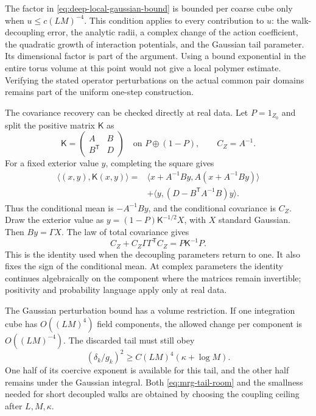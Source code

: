 \documentclass[11pt,letterpaper,reqno]{amsart}
\theoremstyle{definition}
\theoremstyle{remark}
\begin{document}
The factor in \eqref{eq:deep-local-gaussian-bound} is bounded
per coarse cube only when $u\le c(LM)^{-4}$. This condition
applies to every contribution to $u$: the walk-decoupling error,
the analytic radii, a complex change of the action coefficient,
the quadratic growth of interaction potentials, and the Gaussian
tail parameter. Its dimensional factor is part of the argument.
Using a bound exponential in the entire torus volume at this
point would not give a local polymer estimate. Verifying the
stated operator perturbations on the actual common pair domains
remains part of the uniform one-step construction.

The covariance recovery can be checked directly at real data.
Let $P=1_{Z_0}$ and split the positive matrix $\mathsf K$ as
\[
 \mathsf K=\begin{pmatrix}A&B\\B^{\mathsf T}&D\end{pmatrix}
 \quad\text{on }P\oplus(1-P),\qquad C_Z=A^{-1}.
\]
For a fixed exterior value $y$, completing the square gives
\begin{equation}\label{eq:mrg-gaussian-square}
 \begin{split}
 \langle(x,y),\mathsf K(x,y)\rangle
  ={}&\langle x+A^{-1}By,
                       A(x+A^{-1}By)\rangle\\
   &+\langle y,(D-B^{\mathsf T}A^{-1}B)y\rangle.
 \end{split}
\end{equation}
Thus the conditional mean is $-A^{-1}By$, and the conditional
covariance is $C_Z$. Draw the exterior value as
$y=(1-P)\mathsf K^{-1/2}X$, with $X$ standard Gaussian.
Then $By=\Gamma X$. The law of total covariance gives
\begin{equation}\label{eq:mrg-covariance-recovery}
 C_Z+C_Z\Gamma\Gamma^{\mathsf T}C_Z
                      =P\mathsf K^{-1}P.
\end{equation}
This is the identity used when the decoupling parameters return
to one. It also fixes the sign of the conditional mean.
At complex parameters the identity continues algebraically on
the component where the matrices remain invertible; positivity
and probability language apply only at real data.

The Gaussian perturbation bound has a volume restriction. If
one integration cube has $O((LM)^4)$ field components, the
allowed change per component is $O((LM)^{-4})$.
The discarded tail must still obey
\begin{equation}\label{eq:mrg-tail-room}
 (\delta_k/g_k)^2
       \ge C(LM)^4(\kappa+\log M).
\end{equation}
One half of its coercive exponent is available for this tail,
and the other half remains under the Gaussian integral.
Both \eqref{eq:mrg-tail-room} and the smallness needed for
short decoupled walks are obtained by choosing the coupling
ceiling after $L,M,\kappa$.
\end{document}
